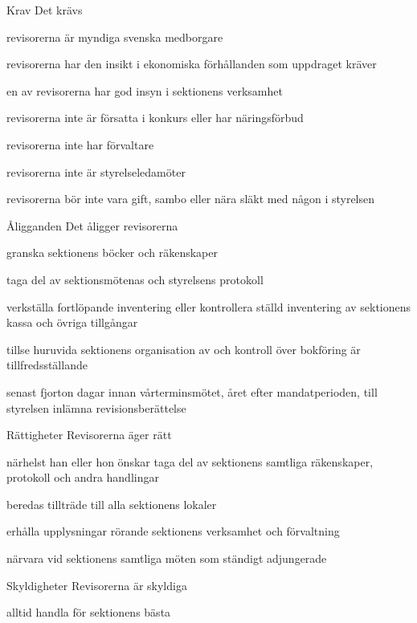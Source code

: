\documentclass[pdfbookmarks,a4paper,11pt]{article}
\newlength{\itemcollength}
\newenvironment{reglemlista}{%
  \begin{list}{}{%
      \setlength{\labelwidth}{\itemcollength}%
      \setlength{\leftmargin}{\labelwidth + \labelsep}%
      \renewcommand{\makelabel}[1]{%
        \raisebox{0pt}[1ex][0pt]{%
          \makebox[\labelwidth][l]{%
            \parbox[t]{\itemcollength}{%
              \raggedright\hspace{0pt}##1}}}\hfill}%
      }}{%
  \end{list}}
\begin{document}
\begin{reglemlista}

	\item[Krav]
	Det krävs
	\begin{attlista}
		\item revisorerna är myndiga svenska medborgare
		\item revisorerna har den insikt i ekonomiska förhållanden som uppdraget kräver
		\item en av revisorerna har god insyn i sektionens verksamhet
		\item revisorerna inte är försatta i konkurs eller har näringsförbud
		\item revisorerna inte har förvaltare
		\item revisorerna inte är styrelseledamöter
		\item revisorerna bör inte vara gift, sambo eller nära släkt med någon i styrelsen
	\end{attlista}

	\item[Åligganden]
	Det åligger revisorerna
	\begin{attlista}
		\item granska sektionens böcker och räkenskaper
		\item taga del av sektionsmötenas och styrelsens protokoll
		\item verkställa fortlöpande inventering eller kontrollera ställd inventering av sektionens kassa och övriga tillgångar
		\item tillse huruvida sektionens organisation av och kontroll över bokföring är tillfredsställande
		\item senast fjorton dagar innan vårterminsmötet, året
		efter mandatperioden, till styrelsen inlämna revisionsberättelse
	\end{attlista}

	\item[Rättigheter]
	Revisorerna äger rätt
	\begin{attlista}
		\item närhelst han eller hon önskar taga del av sektionens samtliga räkenskaper, protokoll och andra handlingar
		\item beredas tillträde till alla sektionens lokaler
		\item erhålla upplysningar rörande sektionens verksamhet och förvaltning
		\item närvara vid sektionens samtliga möten som ständigt adjungerade
	\end{attlista}

	\item[Skyldigheter]
	Revisorerna är skyldiga
	\begin{attlista}
		\item alltid handla för sektionens bästa
	\end{attlista}

\end{reglemlista}
\end{document}
